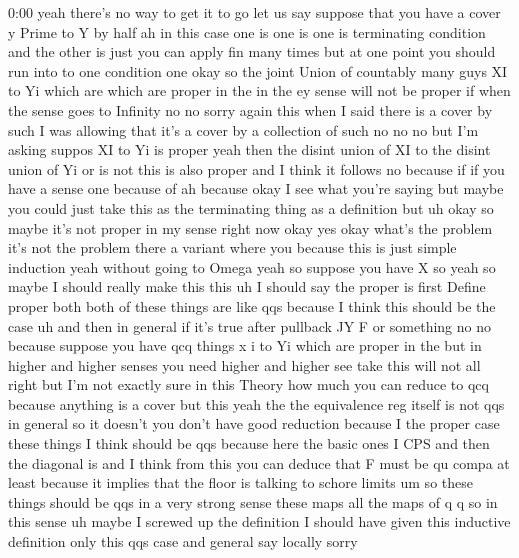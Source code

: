 \begin{unfinished}{0:00}
yeah  there's  no  way  to  get  it  to  go  let
us  say  suppose  that  you  have  a  cover  y
Prime  to
Y  by  half  ah  in  this  case  one  is  one  is
one  is  terminating  condition  and  the
other  is  just  you  can  apply  fin  many
times  but  at  one  point  you  should  run
into  to  one  condition  one  okay  so  the
joint  Union  of  countably  many  guys  XI  to
Yi  which  are  which  are  proper  in  the  in
the  ey  sense  will  not  be  proper  if  when
the  sense  goes  to
Infinity  no  no
sorry  again
this
when  I  said  there  is  a  cover  by  such  I
was  allowing  that  it's  a  cover  by  a
collection  of
such  no  no  no  but  I'm  asking  suppos  XI
to  Yi  is  proper  yeah  then  the  disint
union  of  XI  to  the  disint  union  of  Yi  or
is  not  this  is  also  proper  and  I  think
it  follows  no  because  if  if  you  have  a
sense  one  because  of  ah  because  okay  I
see  what  you're
saying  but  maybe  you  could  just  take
this  as  the  terminating  thing  as  a
definition  but  uh  okay  so  maybe  it's  not
proper  in  my  sense  right  now  okay
yes
okay  what's  the  problem  it's  not  the
problem  there  a  variant  where  you
because  this  is  just  simple  induction
yeah  without  going  to  Omega  yeah  so
suppose  you  have  X  so  yeah  so  maybe  I
should  really  make  this  this  uh  I  should
say  the  proper  is  first  Define  proper
both  both  of  these  things  are  like  qqs
because  I  think  this  should  be  the  case
uh  and  then  in  general  if  it's  true
after  pullback  JY  F  or
something  no  no  because  suppose  you  have
qcq  things  x  i  to  Yi  which  are  proper  in
the  but  in  higher  and  higher  senses  you
need  higher  and  higher  see  take  this
will  not  all  right  but  I'm  not  exactly
sure  in  this  Theory  how  much  you  can
reduce  to  qcq  because  anything  is  a
cover  but  this
yeah  the  the  equivalence  reg  itself  is
not  qqs  in  general  so  it  doesn't  you
don't  have  good  reduction  because  I  the
proper  case  these  things  I  think  should
be  qqs  because  here  the  basic  ones  I  CPS
and  then  the  diagonal  is  and  I  think
from  this  you  can  deduce  that  F  must  be
qu  compa  at  least  because  it  implies
that  the  floor  is  talking  to  schore
limits  um  so  these  things  should  be  qqs
in  a  very  strong  sense  these
maps  all  the  maps  of  q
q  so  in  this  sense  uh  maybe  I  screwed  up
the  definition  I  should  have  given  this
inductive  definition  only  this  qqs  case
and  general  say
locally  sorry

\end{unfinished}
